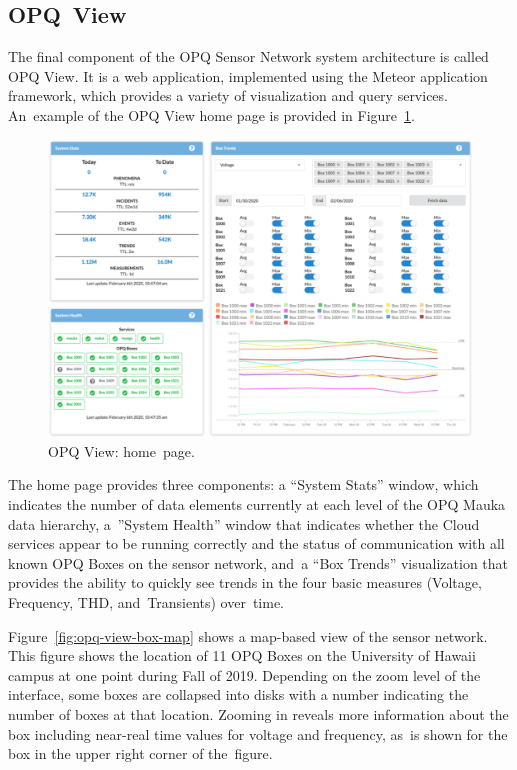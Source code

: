 \documentclass[energies,article,accept,moreauthors,pdftex]{Definitions/mdpi}
\begin{document}
\subsection{OPQ~View}
\label{sec:opq-view}

The final component of the OPQ Sensor Network system architecture is called OPQ View. It is a web application, implemented using the Meteor application framework, which provides a variety of visualization and query services. An~example of the OPQ View home page is provided in Figure~\ref{fig:opq-view-home}.

\begin{figure}[H]
\center \includegraphics[width=5in]{images/view/homepage.png}
\caption{OPQ View: home~page.}
\label{fig:opq-view-home}
\end{figure}

The home page provides three components: a ``System Stats'' window, which indicates the number of data elements currently at each level of the OPQ Mauka data hierarchy, a~''System Health'' window that indicates whether the Cloud services appear to be running correctly and the status of communication with all known OPQ Boxes on the sensor network, and~a ``Box Trends'' visualization that provides the ability to quickly see trends in the four basic measures (Voltage, Frequency, THD, and~Transients) over~time.

Figure~\ref{fig:opq-view-box-map} shows a map-based view of the sensor network. This figure shows the location of 11 OPQ Boxes on the University of Hawaii campus at one point during Fall of 2019. Depending on the zoom level of the interface, some boxes are collapsed into disks with a number indicating the number of boxes at that location. Zooming in reveals more information about the box including near-real time values for voltage and frequency, as~is shown for the box in the upper right corner of the~figure.
\end{document}
